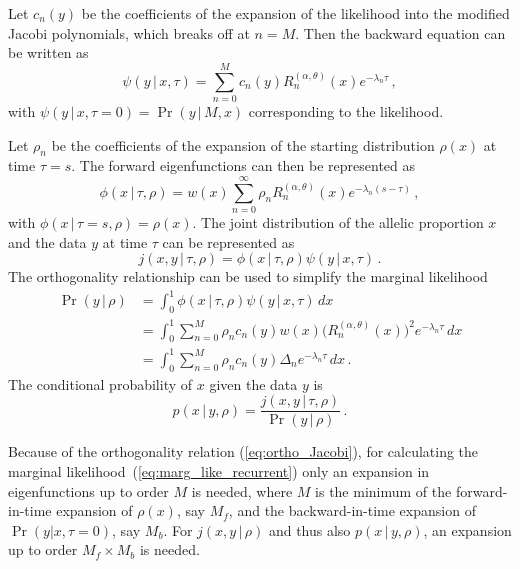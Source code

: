 \documentclass[preprint]{elsarticle}
\newcommand\given{{\,|\,}}
\newcommand\y{\ensuremath{y}}
\begin{document}
Let $c_n(\y)$ be the coefficients of the expansion of the likelihood into the modified Jacobi polynomials, which breaks off at $n=M$. Then the backward equation can be written as
\begin{equation}
\psi(\y\given x,\tau)= \sum_{n=0}^M c_n(\y) R_n^{(\alpha,\theta)}(x) e^{-\lambda_n \tau}\,,
\end{equation}
with $\psi(\y\given x,\tau=0)=\Pr(\y\given M,x)$ corresponding to the likelihood.

Let $\rho_n$ be the coefficients of the expansion of the starting distribution $\rho(x)$ at time $\tau=s$. The forward eigenfunctions can then be represented as 
\begin{equation}
\phi(x\given\tau,\rho)=w(x) \sum_{n=0}^\infty \rho_n R_n^{(\alpha,\theta)}(x) e^{-\lambda_n (s-\tau)}\,,
\end{equation}
with $\phi(x\given\tau=s,\rho)=\rho(x)$. The joint distribution of the allelic proportion $x$ and the data $y$ at time $\tau$ can be represented as
\begin{equation}
j(x,\y\given \tau,\rho)=\phi(x\given\tau,\rho)\psi(\y\given x,\tau)\,.
\end{equation}
The orthogonality relationship can be used to simplify the marginal likelihood
\begin{equation} \label{eq:marg_like_recurrent}
\begin{split}
\Pr(\y\given\rho)&=\int_0^1 \phi(x\given\tau,\rho)\psi(\y\given x,\tau)\,dx\\
    &=\int_0^1 \sum_{n=0}^M \rho_n c_n(\y) w(x) \big(R_n^{(\alpha,\theta)}(x)\big)^2 e^{-\lambda_n \tau}\,dx\\
    &=\int_0^1 \sum_{n=0}^M \rho_n c_n(\y) \Delta_n e^{-\lambda_n \tau}\,dx\,. 
\end{split}
\end{equation}
The conditional probability of $x$ given the data $y$ is
\begin{equation}
p(x\given\y,\rho)=\frac{j(x,\y\given \tau,\rho)}{\Pr(\y\given\rho)}\,.
\end{equation}

Because of the orthogonality relation (\ref{eq:ortho_Jacobi}), for calculating the marginal likelihood~(\ref{eq:marg_like_recurrent}) only an expansion in eigenfunctions up to order $M$ is needed, where $M$ is the minimum of the forward-in-time expansion of $\rho(x)$, say $M_f$, and the backward-in-time expansion of $\Pr(\y|x,\tau=0)$, say $M_b$. For $j(x,\y\given \rho)$ and thus also $p(x\given \y,\rho)$, an expansion up to order $M_f\times M_b$ is needed.
\end{document}
